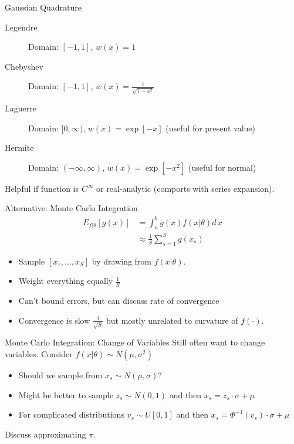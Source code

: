 \begin{frame}{Gaussian Quadrature}
\begin{description}
\item[Legendre] Domain: $[-1,1]$, $w(x) = 1$
\item[Chebyshev] Domain: $[-1,1]$, $w(x) = \frac{1}{\sqrt{1-x^2}}$
\item[Laguerre] Domain: $[0,\infty)$, $w(x) = \exp[-x]$ (useful for present value)
\item[Hermite] Domain: $(-\infty,\infty)$, $w(x) = \exp[-x^2]$ (useful for normal)
\end{description}
Helpful if function is $C^{\infty}$ or real-analytic (comports with series expansion).
\end{frame}



\begin{frame}{Alternative: Monte Carlo Integration}
\begin{align*}
E_{f| \theta}[g(x)] &= \int_{a}^b g(x) f(x | \theta) d\,x\\
&\approx \frac{1}{S} \sum_{s=1}^S g(x_s)
\end{align*}
\begin{itemize}
\item Sample $[x_1,\ldots,x_S]$ by drawing from $f(x | \theta)$.
\item Weight everything equally $\frac{1}{S}$
\item Can't bound errors, but can discuss rate of convergence
\item Convergence is slow $\frac{1}{\sqrt{S}}$ but mostly unrelated to curvature of $f(\cdot)$.
\end{itemize}
\end{frame}


\begin{frame}{Monte Carlo Integration: Change of Variables}
Still often want to change variables. Consider $f(x | \theta) \sim N(\mu,\sigma^2)$
\begin{itemize}
\item Should we sample from $x_s \sim N(\mu,\sigma)$?
\item Might be better to sample $z_s \sim N(0,1)$ and then $x_s = z_s\cdot \sigma + \mu$
\item For complicated distributions $v_s \sim U[0,1]$ and then $x_s = \Phi^{-1}(v_s) \cdot \sigma + \mu$
\end{itemize}
Discuss approximating $\pi$.
\end{frame}

